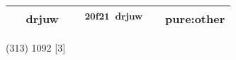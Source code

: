 \documentclass[14pt,a4paper]{scrartcl}
\begin{document}
\begin{longtable}[c]{@{}llllll@{}}
\begin{minipage}[t]{0.14\columnwidth}
𢏚
\strut\end{minipage} &
\begin{minipage}[t]{0.14\columnwidth}\raggedright\strut
drjuw
\strut\end{minipage} &
\begin{minipage}[t]{0.14\columnwidth}\raggedright\strut
\strut\end{minipage} &
\begin{minipage}[t]{0.14\columnwidth}\raggedright\strut
𠼡\textsuperscript{20f21~drjuw}
\strut\end{minipage} &
\begin{minipage}[t]{0.14\columnwidth}\raggedright\strut
\strut\end{minipage} &
\begin{minipage}[t]{0.14\columnwidth}\raggedright\strut
pure:other
\strut\end{minipage}\tabularnewline
\bottomrule
\end{longtable}

(313) 1092 {[}3{]}
\end{document}
